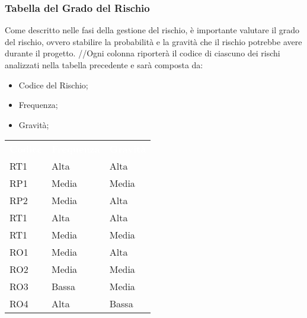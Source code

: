 \subsubsection{Tabella del Grado del Rischio}
Come descritto nelle fasi della gestione del rischio, è importante valutare il grado del rischio, ovvero stabilire la probabilità e la gravità che il rischio potrebbe avere durante il progetto.
//Ogni colonna riporterà il codice di ciascuno dei rischi analizzati nella tabella precedente e sarà composta da:
\begin{itemize}
	\item Codice del Rischio;
	\item Frequenza;
	\item Gravità;
\end{itemize}

{
	\renewcommand{\arraystretch}{2}
	\centering
	\begin{longtable}{ C{2cm} C{3cm} C{3cm}}
		\textcolor{white}{\textbf{Codice}} & \textcolor{white}{\textbf{Frequenza}} & \textcolor{white}{\textbf{Gravità}}\\	
		
		RT1 & Alta & Alta\\
		
		RP1 & Media & Media\\
		
		RP2 & Media & Alta\\
		
		RT1 & Alta & Alta \\
		
		RT1 & Media & Media \\
		
		
		RO1 & Media & Alta \\
		
		RO2 & Media & Media \\
		
		RO3 & Bassa & Media \\
		
		RO4 & Alta & Bassa \\
		
	\end{longtable}
}